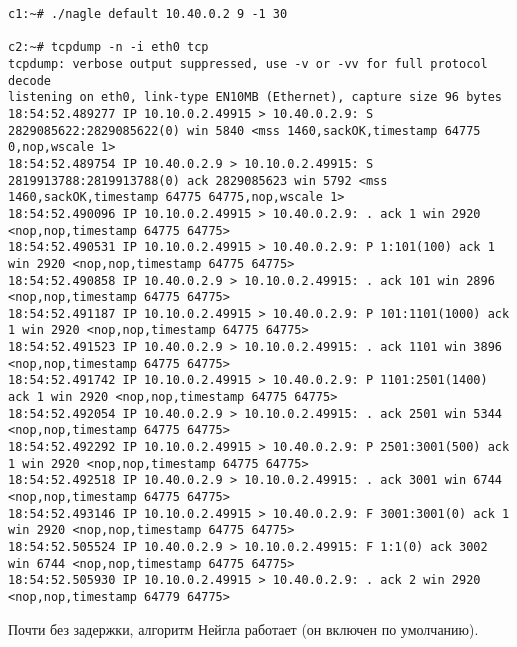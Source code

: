 \documentclass[a4paper,12pt]{article}
\begin{document}
\begin{lstlisting}
c1:~# ./nagle default 10.40.0.2 9 -1 30

c2:~# tcpdump -n -i eth0 tcp
tcpdump: verbose output suppressed, use -v or -vv for full protocol decode
listening on eth0, link-type EN10MB (Ethernet), capture size 96 bytes
18:54:52.489277 IP 10.10.0.2.49915 > 10.40.0.2.9: S 2829085622:2829085622(0) win 5840 <mss 1460,sackOK,timestamp 64775 0,nop,wscale 1>
18:54:52.489754 IP 10.40.0.2.9 > 10.10.0.2.49915: S 2819913788:2819913788(0) ack 2829085623 win 5792 <mss 1460,sackOK,timestamp 64775 64775,nop,wscale 1>
18:54:52.490096 IP 10.10.0.2.49915 > 10.40.0.2.9: . ack 1 win 2920 <nop,nop,timestamp 64775 64775>
18:54:52.490531 IP 10.10.0.2.49915 > 10.40.0.2.9: P 1:101(100) ack 1 win 2920 <nop,nop,timestamp 64775 64775>
18:54:52.490858 IP 10.40.0.2.9 > 10.10.0.2.49915: . ack 101 win 2896 <nop,nop,timestamp 64775 64775>
18:54:52.491187 IP 10.10.0.2.49915 > 10.40.0.2.9: P 101:1101(1000) ack 1 win 2920 <nop,nop,timestamp 64775 64775>
18:54:52.491523 IP 10.40.0.2.9 > 10.10.0.2.49915: . ack 1101 win 3896 <nop,nop,timestamp 64775 64775>
18:54:52.491742 IP 10.10.0.2.49915 > 10.40.0.2.9: P 1101:2501(1400) ack 1 win 2920 <nop,nop,timestamp 64775 64775>
18:54:52.492054 IP 10.40.0.2.9 > 10.10.0.2.49915: . ack 2501 win 5344 <nop,nop,timestamp 64775 64775>
18:54:52.492292 IP 10.10.0.2.49915 > 10.40.0.2.9: P 2501:3001(500) ack 1 win 2920 <nop,nop,timestamp 64775 64775>
18:54:52.492518 IP 10.40.0.2.9 > 10.10.0.2.49915: . ack 3001 win 6744 <nop,nop,timestamp 64775 64775>
18:54:52.493146 IP 10.10.0.2.49915 > 10.40.0.2.9: F 3001:3001(0) ack 1 win 2920 <nop,nop,timestamp 64775 64775>
18:54:52.505524 IP 10.40.0.2.9 > 10.10.0.2.49915: F 1:1(0) ack 3002 win 6744 <nop,nop,timestamp 64775 64775>
18:54:52.505930 IP 10.10.0.2.49915 > 10.40.0.2.9: . ack 2 win 2920 <nop,nop,timestamp 64779 64775>
\end{lstlisting}

Почти без задержки, алгоритм Нейгла работает (он включен по умолчанию).
\end{document}
